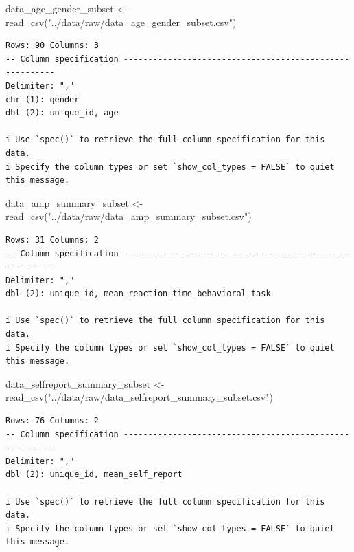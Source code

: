 \documentclass[
  letterpaper,
  DIV=11,
  numbers=noendperiod]{scrreprt}
\newenvironment{Shaded}{\begin{snugshade}}{\end{snugshade}}
\newcommand{\FunctionTok}[1]{\textcolor[rgb]{0.28,0.35,0.67}{#1}}
\newcommand{\NormalTok}[1]{\textcolor[rgb]{0.00,0.23,0.31}{#1}}
\newcommand{\OtherTok}[1]{\textcolor[rgb]{0.00,0.23,0.31}{#1}}
\newcommand{\StringTok}[1]{\textcolor[rgb]{0.13,0.47,0.30}{#1}}
\begin{document}
\begin{Shaded}
\begin{Highlighting}[]
\NormalTok{data\_age\_gender\_subset }\OtherTok{\textless{}{-}} \FunctionTok{read\_csv}\NormalTok{(}\StringTok{"../data/raw/data\_age\_gender\_subset.csv"}\NormalTok{)}
\end{Highlighting}
\end{Shaded}

\begin{verbatim}
Rows: 90 Columns: 3
-- Column specification --------------------------------------------------------
Delimiter: ","
chr (1): gender
dbl (2): unique_id, age

i Use `spec()` to retrieve the full column specification for this data.
i Specify the column types or set `show_col_types = FALSE` to quiet this message.
\end{verbatim}

\begin{Shaded}
\begin{Highlighting}[]
\NormalTok{data\_amp\_summary\_subset }\OtherTok{\textless{}{-}} \FunctionTok{read\_csv}\NormalTok{(}\StringTok{"../data/raw/data\_amp\_summary\_subset.csv"}\NormalTok{)}
\end{Highlighting}
\end{Shaded}

\begin{verbatim}
Rows: 31 Columns: 2
-- Column specification --------------------------------------------------------
Delimiter: ","
dbl (2): unique_id, mean_reaction_time_behavioral_task

i Use `spec()` to retrieve the full column specification for this data.
i Specify the column types or set `show_col_types = FALSE` to quiet this message.
\end{verbatim}

\begin{Shaded}
\begin{Highlighting}[]
\NormalTok{data\_selfreport\_summary\_subset }\OtherTok{\textless{}{-}} \FunctionTok{read\_csv}\NormalTok{(}\StringTok{"../data/raw/data\_selfreport\_summary\_subset.csv"}\NormalTok{)}
\end{Highlighting}
\end{Shaded}

\begin{verbatim}
Rows: 76 Columns: 2
-- Column specification --------------------------------------------------------
Delimiter: ","
dbl (2): unique_id, mean_self_report

i Use `spec()` to retrieve the full column specification for this data.
i Specify the column types or set `show_col_types = FALSE` to quiet this message.
\end{verbatim}
\end{document}

